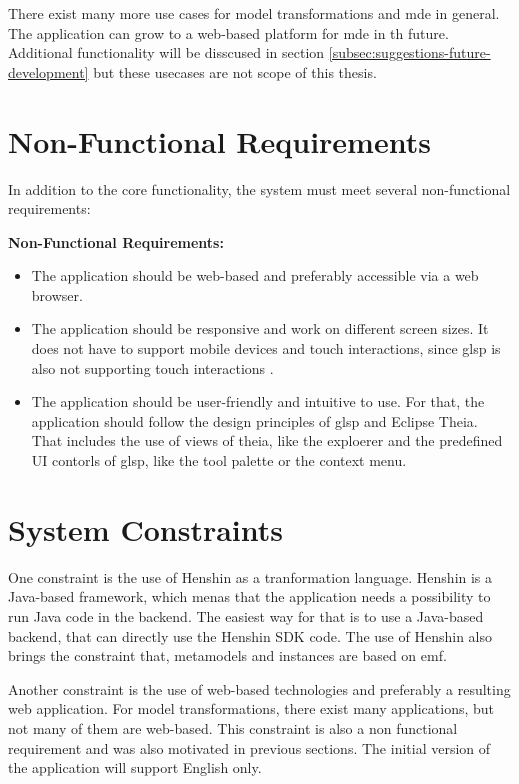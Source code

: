   There exist many more use cases for model transformations and \ac{mde} in general. The application can grow to a web-based platform for \ac{mde} in th future. Additional functionality will be disscused in section \ref{subsec:suggestions-future-development} but these usecases are not scope of this thesis.

  \section{Non-Functional Requirements}
  \label{subsec:non-functional-requirements}

  In addition to the core functionality, the system must meet several non-functional requirements:

  \textbf{Non-Functional Requirements:}
  \begin{itemize}
    \item The application should be web-based and preferably accessible via a web browser.
    \item The application should be responsive and work on different screen sizes. It does not have to support mobile devices and touch interactions, since \ac{glsp} is also not supporting touch interactions \cite{glsp-repo}.
    \item The application should be user-friendly and intuitive to use. For that, the application should follow the design principles of \ac{glsp} and Eclipse Theia. That includes the use of views of theia, like the exploerer and the predefined UI contorls of \ac{glsp}, like the tool palette or the context menu.
  \end{itemize}

  \section{System Constraints}
  \label{subsec:system-constraints}

  One constraint is the use of Henshin as a tranformation language. Henshin is a Java-based framework, which menas that the application needs a possibility to run Java code in the backend. The easiest way for that is to use a Java-based backend, that can directly use the Henshin SDK code.
  The use of Henshin also brings the constraint that, metamodels and instances are based on \ac{emf}.

  Another constraint is the use of web-based technologies and preferably a resulting web application. For model transformations, there exist many applications, but not many of them are web-based. This constraint is also a non functional requirement and was also motivated in previous sections.
  The initial version of the application will support English only.